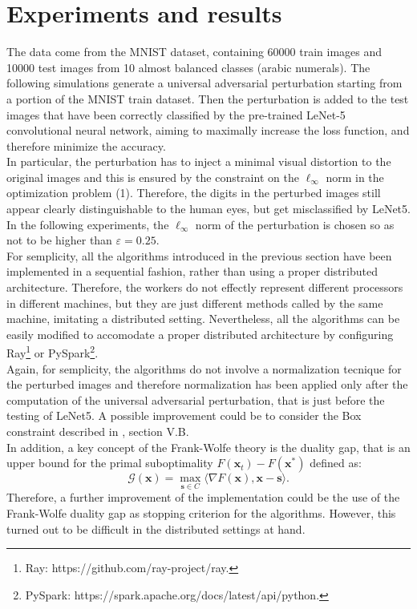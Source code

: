 \section{Experiments and results}
The data come from the MNIST dataset, containing 60000 train images and 10000 test images from 10 almost balanced classes (arabic numerals). The following simulations generate a universal adversarial perturbation starting from a portion of the MNIST train dataset. Then the perturbation is added to the test images that have been correctly classified by the pre-trained LeNet-5 convolutional neural network, aiming to maximally increase the loss function, and therefore minimize the accuracy.\\
In particular, the perturbation has to inject a minimal visual distortion to the original images and this is ensured by the constraint on the $\ell_{\infty}$ norm in the optimization problem (1). Therefore, the digits in the perturbed images still appear clearly distinguishable to the human eyes, but get misclassified by LeNet5.\\
In the following experiments, the $\ell_{\infty}$ norm of the perturbation is chosen so as not to be higher than $\varepsilon=0.25$.\\

For semplicity, all the algorithms introduced in the previous section have been implemented in a sequential fashion, rather than using a proper distributed architecture. Therefore, the workers do not effectly represent different processors in different machines, but they are just different methods called by the same machine, imitating a distributed setting. Nevertheless, all the algorithms can be easily modified to accomodate a proper distributed architecture by configuring Ray\footnote{Ray: https://github.com/ray-project/ray.} or PySpark\footnote{PySpark: https://spark.apache.org/docs/latest/api/python.}.\\

Again, for semplicity, the algorithms do not involve a normalization tecnique for the perturbed images and therefore normalization has been applied only after the computation of the universal adversarial perturbation, that is just before the testing of LeNet5. A possible improvement could be to consider the Box constraint described in \cite{A1}, section V.B.\\

In addition, a key concept of the Frank-Wolfe theory is the duality gap, that is an upper bound for the primal suboptimality $F(\mathbf{x}_t)-F(\mathbf{x}^*)$ defined as:
\begin{equation}
	\mathcal{G}(\mathbf{x}) =\max_{\mathbf{s}\in\mathit{C}} \langle \nabla F(\mathbf{x}),\mathbf{x}-\mathbf{s}\rangle.
\end{equation}
Therefore, a further improvement of the implementation could be the use of the Frank-Wolfe duality gap as stopping criterion for the algorithms. However, this turned out to be difficult in the distributed settings at hand.

